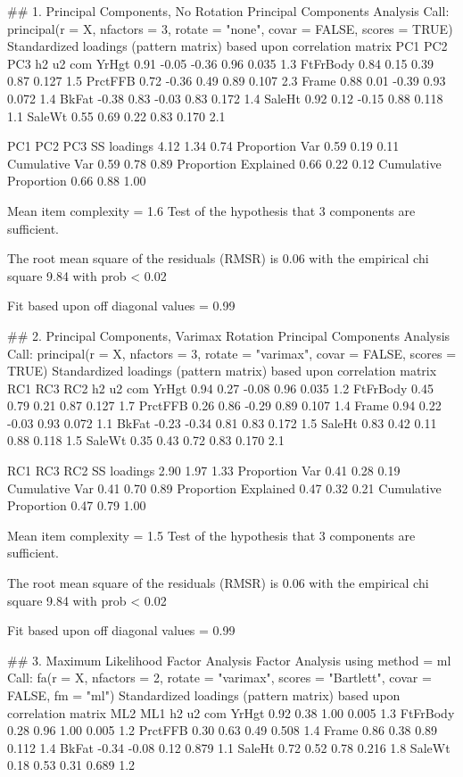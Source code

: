\begin{rc}

## 1. Principal Components, No Rotation
Principal Components Analysis
Call: principal(r = X, nfactors = 3, rotate = "none", covar = FALSE, 
    scores = TRUE)
Standardized loadings (pattern matrix) based upon correlation matrix
           PC1   PC2   PC3   h2    u2 com
YrHgt     0.91 -0.05 -0.36 0.96 0.035 1.3
FtFrBody  0.84  0.15  0.39 0.87 0.127 1.5
PrctFFB   0.72 -0.36  0.49 0.89 0.107 2.3
Frame     0.88  0.01 -0.39 0.93 0.072 1.4
BkFat    -0.38  0.83 -0.03 0.83 0.172 1.4
SaleHt    0.92  0.12 -0.15 0.88 0.118 1.1
SaleWt    0.55  0.69  0.22 0.83 0.170 2.1

                       PC1  PC2  PC3
SS loadings           4.12 1.34 0.74
Proportion Var        0.59 0.19 0.11
Cumulative Var        0.59 0.78 0.89
Proportion Explained  0.66 0.22 0.12
Cumulative Proportion 0.66 0.88 1.00

Mean item complexity =  1.6
Test of the hypothesis that 3 components are sufficient.

The root mean square of the residuals (RMSR) is  0.06 
 with the empirical chi square  9.84  with prob <  0.02 

Fit based upon off diagonal values = 0.99

## 2. Principal Components, Varimax Rotation
Principal Components Analysis
Call: principal(r = X, nfactors = 3, rotate = "varimax", covar = FALSE, 
    scores = TRUE)
Standardized loadings (pattern matrix) based upon correlation matrix
           RC1   RC3   RC2   h2    u2 com
YrHgt     0.94  0.27 -0.08 0.96 0.035 1.2
FtFrBody  0.45  0.79  0.21 0.87 0.127 1.7
PrctFFB   0.26  0.86 -0.29 0.89 0.107 1.4
Frame     0.94  0.22 -0.03 0.93 0.072 1.1
BkFat    -0.23 -0.34  0.81 0.83 0.172 1.5
SaleHt    0.83  0.42  0.11 0.88 0.118 1.5
SaleWt    0.35  0.43  0.72 0.83 0.170 2.1

                       RC1  RC3  RC2
SS loadings           2.90 1.97 1.33
Proportion Var        0.41 0.28 0.19
Cumulative Var        0.41 0.70 0.89
Proportion Explained  0.47 0.32 0.21
Cumulative Proportion 0.47 0.79 1.00

Mean item complexity =  1.5
Test of the hypothesis that 3 components are sufficient.

The root mean square of the residuals (RMSR) is  0.06 
 with the empirical chi square  9.84  with prob <  0.02 

Fit based upon off diagonal values = 0.99

## 3. Maximum Likelihood Factor Analysis
Factor Analysis using method =  ml
Call: fa(r = X, nfactors = 2, rotate = "varimax", scores = "Bartlett", 
    covar = FALSE, fm = "ml")
Standardized loadings (pattern matrix) based upon correlation matrix
           ML2   ML1   h2    u2 com
YrHgt     0.92  0.38 1.00 0.005 1.3
FtFrBody  0.28  0.96 1.00 0.005 1.2
PrctFFB   0.30  0.63 0.49 0.508 1.4
Frame     0.86  0.38 0.89 0.112 1.4
BkFat    -0.34 -0.08 0.12 0.879 1.1
SaleHt    0.72  0.52 0.78 0.216 1.8
SaleWt    0.18  0.53 0.31 0.689 1.2


\end{rc}
